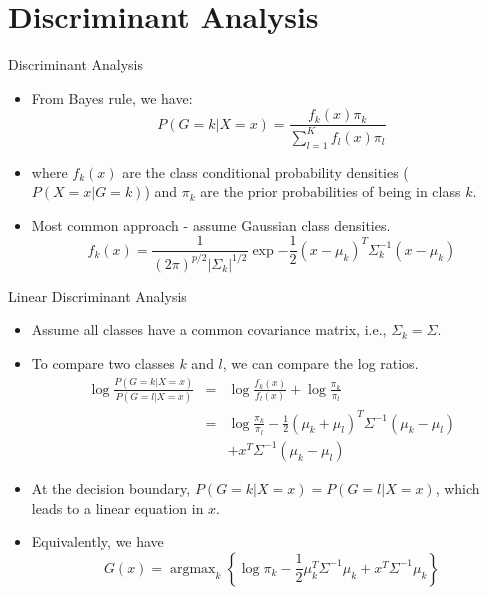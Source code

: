 \documentclass[aspectratio=169]{beamer}
\DeclareMathOperator*{\argmax}{argmax}
\begin{document}
\section{Discriminant Analysis}

\begin{frame}{Discriminant Analysis}
    \begin{itemize}
        \item From Bayes rule, we have:
        \begin{equation*}
            P(G = k|X = x) = \frac{f_k(x)\pi_k}{\sum_{l=1}^K f_l(x)\pi_l}
        \end{equation*}
        \item where $f_k(x)$ are the class conditional probability densities ($P(X = x | G=k)$) and $\pi_k$ are the prior probabilities of being in class $k$.
        \item Most common approach - assume Gaussian class densities.
        \begin{equation*}
            f_k(x) = \frac{1}{(2\pi)^{p/2}|\Sigma_k|^{1/2}}\exp{-\frac{1}{2}(x-\mu_k)^T\Sigma_k^{-1}(x-\mu_k)}
        \end{equation*}
    \end{itemize}
\end{frame}


\begin{frame}{Linear Discriminant Analysis}
    \begin{itemize}
        \item Assume all classes have a common covariance matrix, i.e., $\Sigma_k = \Sigma$.
        \item To compare two classes $k$ and $l$, we can compare the log ratios.
        \begin{eqnarray*}
            \log{\frac{P(G = k|X = x)}{P(G = l|X = x)}} & = & \log{\frac{f_k(x)}{f_l(x)}} + \log{\frac{\pi_k}{\pi_l}}\\
            & = & \log{\frac{\pi_k}{\pi_l}} -\frac{1}{2}(\mu_k+\mu_l)^T\Sigma^{-1}(\mu_k-\mu_l) \\
            & & + x^T \Sigma^{-1} (\mu_k - \mu_l)
        \end{eqnarray*}
        \item At the decision boundary, $P(G=k|X=x) = P(G=l|X=x)$, which leads to a linear equation in $x$.
        \item Equivalently, we have
        \begin{equation*}
            G(x) = \argmax_k \left \{ \log{\pi_k} -\frac{1}{2}\mu_k^T\Sigma^{-1}\mu_k + x^T \Sigma^{-1} \mu_k \right \}
        \end{equation*}
    \end{itemize}
\end{frame}
\end{document}
